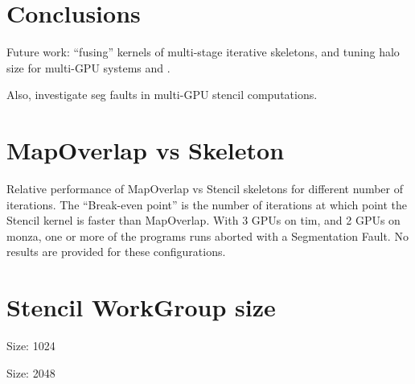 \newpage
\section{Conclusions}

Future work: ``fusing'' kernels of multi-stage iterative skeletons,
and tuning halo size for multi-GPU systems and .

Also, investigate seg faults in multi-GPU stencil computations.

\label{bibliography}
\printbibliography

\clearpage
\begin{appendices}
\section{MapOverlap vs Skeleton}\label{app:mo-vs-stencil}

Relative performance of MapOverlap vs Stencil skeletons for different
number of iterations. The ``Break-even point'' is the number of
iterations at which point the Stencil kernel is faster than
MapOverlap. With 3 GPUs on tim, and 2 GPUs on monza, one or more of
the programs runs aborted with a Segmentation Fault. No results are
provided for these configurations.

\begin{table}
\footnotesize
\centering

%
\end{table}

\clearpage
\section{Stencil WorkGroup size}

\begin{table}
\scriptsize

\caption{Size: 1024}
\end{table}

\begin{table}
\scriptsize

\caption{Size: 2048}
\end{table}

\end{appendices}


